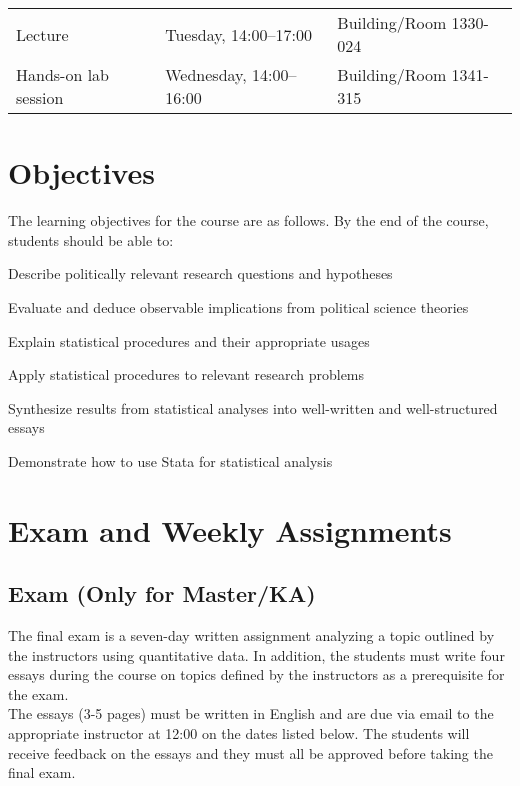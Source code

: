 \documentclass[11pt,a4paper]{article}
\begin{document}
\begin{tabular}{lll}
Lecture & Tuesday, 14:00--17:00 & Building/Room 1330-024\\
Hands-on lab session & Wednesday, 14:00--16:00 & Building/Room 1341-315\\
\end{tabular}


\clearpage
\section{Objectives}
The learning objectives for the course are as follows. By the end of the course, students should be able to:

\begin{enumerate*}
\item Describe politically relevant research questions and hypotheses
\item Evaluate and deduce observable implications from political science theories 
\item Explain statistical procedures and their appropriate usages
\item Apply statistical procedures to relevant research problems
\item Synthesize results from statistical analyses into well-written and well-structured essays
\item Demonstrate how to use Stata for statistical analysis
\end{enumerate*}

\section{Exam and Weekly Assignments}

\subsection{Exam (Only for Master/KA)}
The final exam is a seven-day written assignment analyzing a topic outlined by the instructors using quantitative data. In addition, the students must write four essays during the course on topics defined by the instructors as a prerequisite for the exam.\\

The essays (3-5 pages) must be written in English and are due via email to the appropriate instructor at 12:00 on the dates listed below. The students will receive feedback on the essays and they must all be approved before taking the final exam.
\end{document}
